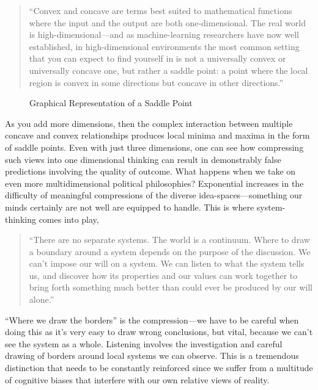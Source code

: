 \documentclass[12pt,a4paper]{article}
\begin{document}
\begin{quotation}
   \color{G-Moon}
   \noindent ``Convex and concave are terms best suited to mathematical functions where the input and the output are both one-dimensional. The real world is high-dimensional---and as machine-learning researchers have now well established, in high-dimensional environments the most common setting that you can expect to find yourself in is not a universally convex or universally concave one, but rather a saddle point: a point where the local region is convex in some directions but concave in other directions.''~\cite{vitalik}
\end{quotation}

\begin{figure}[ht]
   \centering
   \caption*{Graphical Representation of a Saddle Point}
\end{figure}

As you add more dimensions, then the complex interaction between multiple concave and convex relationships produces local minima and maxima in the form of saddle points. Even with just three dimensions, one can see how compressing such views into one dimensional thinking can result in demonstrably false predictions involving the quality of outcome. What happens when we take on even more multidimensional political philosophies? Exponential increases in the difficulty of meaningful compressions of the diverse idea-spaces---something our minds certainly are not well are equipped to handle. This is where system-thinking comes into play,

\begin{quotation}
   \color{G-Moon}
   \noindent``There are no separate systems. The world is a continuum. Where to draw a boundary around a system depends on the purpose of the discussion. We can't impose our will on a system. We can listen to what the system tells us, and discover how its properties and our values can work together to bring forth something much better than could ever be produced by our will alone.''~\cite{systems}
\end{quotation}

``Where we draw the borders'' is the compression---we have to be careful when doing this as it's very easy to draw wrong conclusions, but vital, because we can't see the system as a whole. Listening involves the investigation and careful drawing of borders around local systems we can observe. This is a tremendous distinction that needs to be constantly reinforced since we suffer from a multitude of cognitive biases that interfere with our own relative views of reality. 
\end{document}
